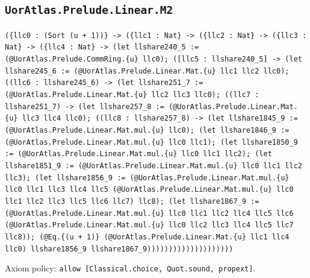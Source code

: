 \documentclass[11pt]{article}
\begin{document}
\subsection*{\texttt{UorAtlas.Prelude.Linear.M2}}
\noindent\texttt{(\{llc0 : (Sort (u + 1))\} -> (\{llc1 : Nat\} -> (\{llc2 : Nat\} -> (\{llc3 : Nat\} -> (\{llc4 : Nat\} -> (let llshare240\_5 := (@UorAtlas.Prelude.CommRing.\{u\} llc0); ([llc5 : llshare240\_5] -> (let llshare245\_6 := (@UorAtlas.Prelude.Linear.Mat.\{u\} llc1 llc2 llc0); ((llc6 : llshare245\_6) -> (let llshare251\_7 := (@UorAtlas.Prelude.Linear.Mat.\{u\} llc2 llc3 llc0); ((llc7 : llshare251\_7) -> (let llshare257\_8 := (@UorAtlas.Prelude.Linear.Mat.\{u\} llc3 llc4 llc0); ((llc8 : llshare257\_8) -> (let llshare1845\_9 := (@UorAtlas.Prelude.Linear.Mat.mul.\{u\} llc0); (let llshare1846\_9 := (@UorAtlas.Prelude.Linear.Mat.mul.\{u\} llc0 llc1); (let llshare1850\_9 := (@UorAtlas.Prelude.Linear.Mat.mul.\{u\} llc0 llc1 llc2); (let llshare1851\_9 := (@UorAtlas.Prelude.Linear.Mat.mul.\{u\} llc0 llc1 llc2 llc3); (let llshare1856\_9 := (@UorAtlas.Prelude.Linear.Mat.mul.\{u\} llc0 llc1 llc3 llc4 llc5 (@UorAtlas.Prelude.Linear.Mat.mul.\{u\} llc0 llc1 llc2 llc3 llc5 llc6 llc7) llc8); (let llshare1867\_9 := (@UorAtlas.Prelude.Linear.Mat.mul.\{u\} llc0 llc1 llc2 llc4 llc5 llc6 (@UorAtlas.Prelude.Linear.Mat.mul.\{u\} llc0 llc2 llc3 llc4 llc5 llc7 llc8)); (@Eq.\{(u + 1)\} (@UorAtlas.Prelude.Linear.Mat.\{u\} llc1 llc4 llc0) llshare1856\_9 llshare1867\_9))))))))))))))))))))}\par
\noindent Axiom policy: \texttt{allow [Classical.choice, Quot.sound, propext]}.\par
\end{document}
